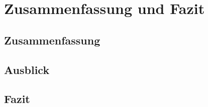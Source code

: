 
\chapter{Zusammenfassung und Fazit}

\section{Zusammenfassung}

\section{Ausblick}


\section{Fazit}
